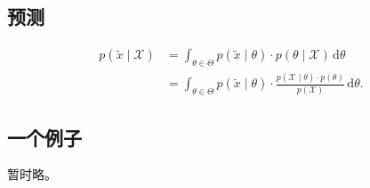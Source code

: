 \documentclass[utf8]{ctexart}
\begin{document}
\subsection{预测}

\begin{align}
p(\tilde{x} \mid \mathcal{X}) 
	&= \int_{\theta \in \Theta} p(\tilde{x} \mid \theta) \cdot p(\theta \mid \mathcal{X}) \, \text{d} \theta \\
	&= \int_{\theta \in \Theta} p(\tilde{x} \mid \theta) \cdot \frac{p(\mathcal{X} \mid \theta) \cdot p(\theta)}{p(\mathcal{X})} \, \text{d} \theta .
\end{align}

\subsection{一个例子}
暂时略。
\end{document}
